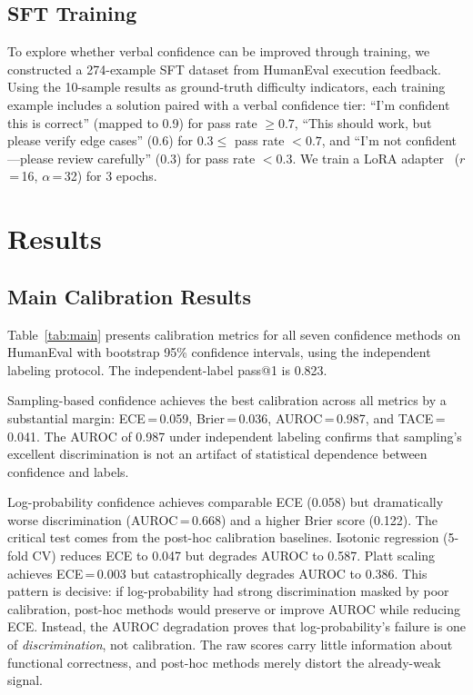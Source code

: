 \documentclass{article}
\begin{document}
\subsection{SFT Training}
\label{sec:sft_method}

To explore whether verbal confidence can be improved through training, we constructed a 274-example SFT dataset from HumanEval execution feedback. Using the 10-sample results as ground-truth difficulty indicators, each training example includes a solution paired with a verbal confidence tier: ``I'm confident this is correct'' (mapped to 0.9) for pass rate $\geq 0.7$, ``This should work, but please verify edge cases'' (0.6) for $0.3 \leq$ pass rate $< 0.7$, and ``I'm not confident---please review carefully'' (0.3) for pass rate $< 0.3$. We train a LoRA adapter~\citep{hu2022lora} ($r$\,=\,16, $\alpha$\,=\,32) for 3 epochs.

\section{Results}
\label{sec:results}

\subsection{Main Calibration Results}
\label{sec:main_results}

Table~\ref{tab:main} presents calibration metrics for all seven confidence methods on HumanEval with bootstrap 95\% confidence intervals, using the independent labeling protocol. The independent-label pass@1 is 0.823.

Sampling-based confidence achieves the best calibration across all metrics by a substantial margin: ECE\,=\,0.059, Brier\,=\,0.036, AUROC\,=\,0.987, and TACE\,=\,0.041. The AUROC of 0.987 under independent labeling confirms that sampling's excellent discrimination is not an artifact of statistical dependence between confidence and labels.

Log-probability confidence achieves comparable ECE (0.058) but dramatically worse discrimination (AUROC\,=\,0.668) and a higher Brier score (0.122). The critical test comes from the post-hoc calibration baselines. Isotonic regression (5-fold CV) reduces ECE to 0.047 but degrades AUROC to 0.587. Platt scaling achieves ECE\,=\,0.003 but catastrophically degrades AUROC to 0.386. This pattern is decisive: if log-probability had strong discrimination masked by poor calibration, post-hoc methods would preserve or improve AUROC while reducing ECE. Instead, the AUROC degradation proves that log-probability's failure is one of \emph{discrimination}, not calibration. The raw scores carry little information about functional correctness, and post-hoc methods merely distort the already-weak signal.
\end{document}
